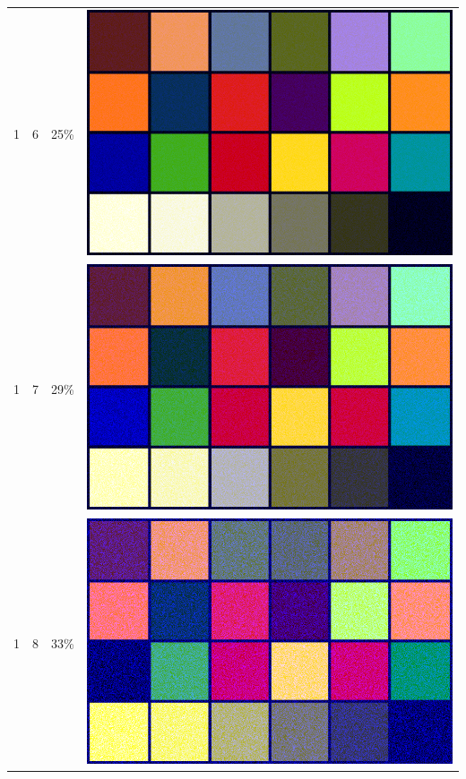 \documentclass[times, utf8, seminar]{fer}
\begin{document}
\begin{center}
\begin{longtable}{|c|c|c|c|}
1 & 6 &25\% & \includegraphics[scale=0.3]{../benchmark_results/color_chart/1_components-6_bits.png} \\
1 & 7 &29\% & \includegraphics[scale=0.3]{../benchmark_results/color_chart/1_components-7_bits.png} \\
1 & 8 &33\% & \includegraphics[scale=0.3]{../benchmark_results/color_chart/1_components-8_bits.png} \\

\end{longtable}
\end{center}
\end{document}
